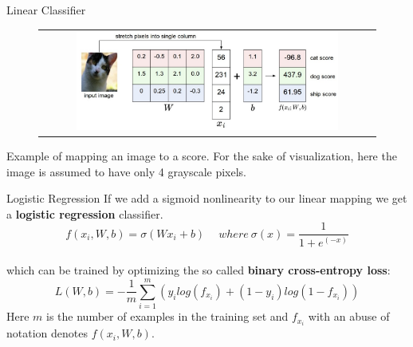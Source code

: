 \documentclass[aspectratio=169]{beamer}
\begin{document}
\begin{frame}{Linear Classifier}
\begin{figure}
\begin{tabular}{c}
\includegraphics[width=0.8\textwidth]{img/dnn/linear_classifier.jpg}
\end{tabular}
\end{figure}
\small{Example of mapping an image to a score. For the sake of visualization, here the image is assumed to have only 4 grayscale pixels.}
\end{frame}


\begin{frame}{Logistic Regression}
If we add a sigmoid nonlinearity to our linear mapping we get a \textbf{logistic regression} classifier.
\begin{equation*}
f(x_i,W,b) = \sigma(Wx_i + b)\ \quad where\ \sigma(x) = \frac{1}{1 + e^{(-x)}}
\end{equation*}\\
\vspace{0.2cm}
which can be trained by optimizing the so called \textbf{binary cross-entropy loss}:
\begin{equation}
L(W, b) = - \frac{1}{m} \sum_{i=1}^{m} \left(y_i log(f_{x_i}) + (1-y_i)log(1-f_{x_i})\right)
\end{equation}
Here $m$ is the number of examples in the training set and $f_{x_i}$ with an abuse of notation denotes $f(x_i, W, b)$.
\end{frame}

\end{document}
